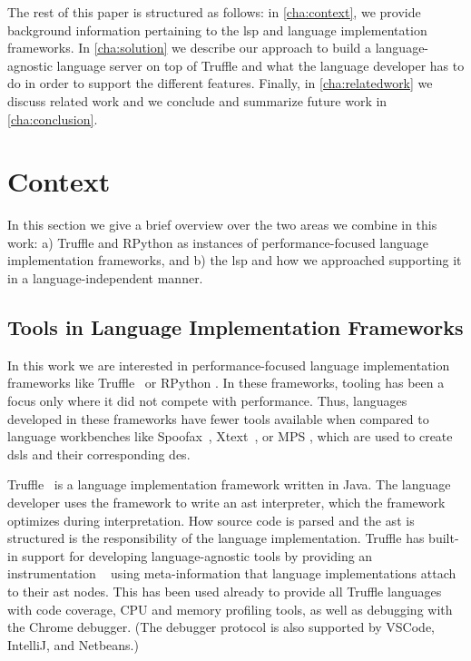\documentclass[sigplan,10pt,screen]{acmart}
\makeatletter
\renewcommand\paragraph{\@startsection{paragraph}{4}{\z@}%
   {-.2\baselineskip \@plus -2\p@ \@minus -.2\p@}%
   {-3.5\p@}%
   {\@parfont\@addspaceafter}}
\makeatother
\begin{document}
The rest of this paper is structured as follows: in \autoref{cha:context}, we
provide background information pertaining to the \ac{lsp} and language
implementation frameworks. In \autoref{cha:solution} we describe our approach to
build a language-agnostic language server on top of Truffle and what the
language developer has to do in order to support the different features. %
Finally, in \autoref{cha:relatedwork} we discuss
related work and we conclude and summarize future work in
\autoref{cha:conclusion}.

\section{Context}
\label{cha:context}

In this section we give a brief overview over the two areas we combine in this
work: a) Truffle and RPython as instances of performance-focused language
implementation frameworks, and b) the \ac{lsp} and how we approached supporting
it in a language-independent manner.

\subsection{Tools in Language Implementation Frameworks}

In this work we are interested in performance-focused language implementation
frameworks like Truffle~\cite{wimmer2012truffle} or RPython
\cite{ancona2007rpython}. In these frameworks, tooling has been a focus only
where it did not compete with performance. Thus, languages developed in these
frameworks have fewer tools available when compared to language workbenches like
Spoofax~\cite{kats2010spoofax}, Xtext~\cite{eysholdt2010xtext}, or MPS
\cite{voelter2012language}, which are used to create \acp{dsl} and their
corresponding \acp{de}.

Truffle~\cite{wimmer2012truffle} is a language implementation framework written
in Java. The language developer uses the framework to write an \ac{ast}
interpreter, which the framework optimizes during interpretation. How source
code is parsed and the \ac{ast} is structured is the responsibility of the
language implementation. Truffle has built-in support for developing
language-agnostic tools by providing an instrumentation
\api~\cite{van2015building} using meta-information that language implementations
attach to their \ac{ast} nodes. This \api has been used already to provide all
Truffle languages with code coverage, CPU and memory profiling tools, as well as
debugging with the Chrome debugger. (The debugger protocol is also supported by
VSCode, IntelliJ, and Netbeans.)
\end{document}
